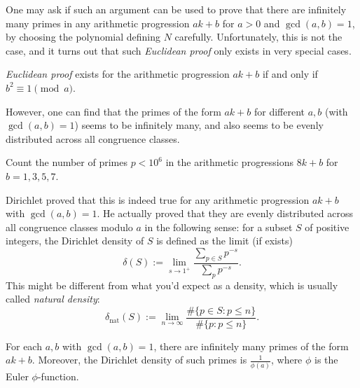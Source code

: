 One may ask if such an argument can be used to prove that there are infinitely many primes in any arithmetic progression $ak + b$ for $a > 0$ and $\gcd(a, b) = 1$, by choosing the polynomial defining $N$ carefully.
Unfortunately, this is not the case, and it turns out that such \emph{Euclidean proof} only exists in very special cases.
\begin{theorem}
    \emph{Euclidean proof} exists for the arithmetic progression $ak + b$ if and only if $b^2 \equiv 1 \pmod{a}$.
\end{theorem}
 
However, one can find that the primes of the form $ak + b$ for different $a, b$ (with $\gcd(a, b) = 1$) seems to be infinitely many, and also seems to be evenly distributed across all congruence classes.
\begin{exercise}\sage
    Count the number of primes $p < 10^6$ in the arithmetic progressions $8k + b$ for $b = 1, 3, 5, 7$.
\end{exercise}

Dirichlet \cite{dirichlet1837beweis} proved that this is indeed true for any arithmetic progression $ak + b$ with $\gcd(a, b) = 1$.
He actually proved that they are evenly distributed across all congruence classes modulo $a$ in the following sense: for a subset $S$ of positive integers, the Dirichlet density of $S$ is defined as the limit (if exists)
\begin{equation}
    \delta(S) := \lim_{s \to 1^+} \frac{\sum_{p \in S} p^{-s}}{\sum_{p} p^{-s}}.
    \label{eqn:dirichlet-density}
\end{equation}
This might be different from what you'd expect as a density, which is usually called \emph{natural density}:
\begin{equation}
    \delta_{\mathrm{nat}}(S) := \lim_{n \to \infty} \frac{\#\{p \in S : p \le n\}}{\#\{p : p \le n\}}.
\end{equation}

\begin{theorem}
    For each $a, b$ with $\gcd(a, b) = 1$, there are infinitely many primes of the form $ak + b$.
    Moreover, the Dirichlet density of such primes is $\frac{1}{\phi(a)}$, where $\phi$ is the Euler $\phi$-function.
\end{theorem}

